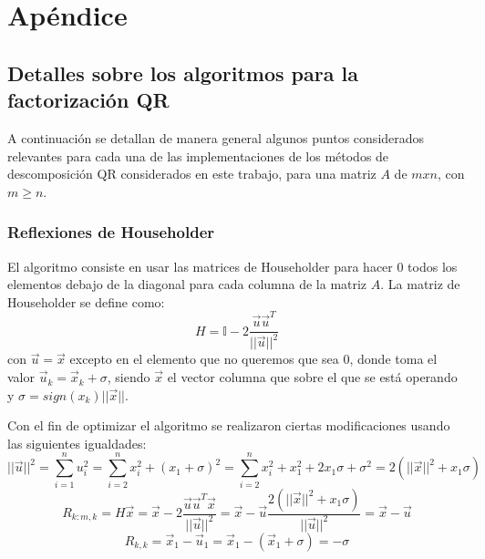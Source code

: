 \documentclass[journal, monochrome]{IEEEtran}
\begin{document}
\clearpage
\section{Apéndice}
\vspace{0.5cm}
\subsection{Detalles sobre los algoritmos para la factorización QR}
\par
A continuación se detallan de manera general algunos puntos considerados relevantes para cada una de las implementaciones de los métodos de descomposición QR considerados en este trabajo, para una matriz $A$ de $mxn$, con $m \geq n$.

\vspace{0.5cm}
\subsubsection{Reflexiones de Householder}
\par
El algoritmo consiste en usar las matrices de Householder para hacer 0 todos los elementos debajo de la diagonal para cada columna de la matriz $A$. La matriz de Householder se define como:
\begin{equation}
H = \mathbb{I} - 2\frac{\vec{u}\vec{u}^{T}}{||\vec{u}||^{2}}
\label{equation:householder}
\end{equation}
con $\vec{u} = \vec{x}$ excepto en el elemento que no queremos que sea 0, donde toma el valor $\vec{u}_{k} = \vec{x}_{k} + \sigma$, siendo $\vec{x}$ el vector columna que sobre el que se está operando y $\sigma = sign(x_{k})||\vec{x}||$.
\par
Con el fin de optimizar el algoritmo se realizaron ciertas modificaciones usando las siguientes igualdades:
\begin{equation}
||\vec{u}||^{2} = \sum_{i=1}^{n} u_{i}^{2} = \sum_{i=2}^{n} x_{i}^{2} + (x_{1}+\sigma)^{2}
 = \sum_{i=2}^{n} x_{i}^{2} + x_{1}^{2} + 2x_{1}\sigma + \sigma^{2} = 2(||\vec{x}||^{2} + x_{1}\sigma)
\end{equation}
\begin{equation}
R_{k:m,k} = H\vec{x} = \vec{x} - 2\frac{\vec{u}\vec{u}^{T}\vec{x}}{||\vec{u}||^{2}} = \vec{x} - \vec{u}\frac{2(||\vec{x}||^{2}+x_{1}\sigma)}{||\vec{u}||^{2}} = \vec{x} - \vec{u}
\end{equation}
\begin{equation}
R_{k,k} = \vec{x}_{1} - \vec{u}_{1} = \vec{x}_{1} - (\vec{x}_{1} + \sigma) = -\sigma
\end{equation}
\end{document}
